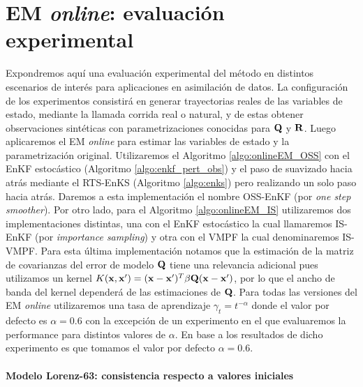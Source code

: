 \section{EM \textit{online}: evaluación experimental}

Expondremos aquí una evaluación experimental del método en distintos escenarios de interés para aplicaciones en asimilación de datos. La configuración de los experimentos consistirá en generar trayectorias reales de las variables de estado, mediante la llamada corrida real o natural, y de estas obtener observaciones sintéticas con parametrizaciones conocidas para $\mathbf{Q}$ y $\mathbf{R}$. Luego aplicaremos el EM \textit{online} para estimar las variables de estado y la parametrización original. Utilizaremos el Algoritmo \ref{algo:onlineEM_OSS} con el EnKF estocástico (Algoritmo \ref{algo:enkf_pert_obs}) y el paso de suavizado hacia atrás mediante el RTS-EnKS (Algoritmo \ref{algo:enks}) pero realizando un solo paso hacia atrás. Daremos a esta implementación el nombre OSS-EnKF (por \textit{one step smoother}). Por otro lado, para el Algoritmo \ref{algo:onlineEM_IS} utilizaremos dos implementaciones distintas, una con el EnKF estocástico la cual llamaremos IS-EnKF (por \textit{importance sampling}) y otra con el VMPF la cual denominaremos IS-VMPF. Para esta última implementación notamos que la estimación de la matriz de covarianzas del error de modelo $\mathbf{Q}$ tiene una relevancia adicional pues utilizamos un kernel $K(\mathbf{x}, \mathbf{x}') = (\mathbf{x} - \mathbf{x}')^T \beta \mathbf{Q} (\mathbf{x} - \mathbf{x}')$, por lo que el ancho de banda del kernel dependerá de las estimaciones de $\mathbf{Q}$. Para todas las versiones del EM \textit{online} utilizaremos una tasa de aprendizaje $\gamma_t = t^{-\alpha}$ \citep{Legland1997} donde el valor por defecto es $\alpha = 0.6$ con la excepción de un experimento en el que evaluaremos la performance para distintos valores de $\alpha$. En base a los resultados de dicho experimento es que tomamos el valor por defecto $\alpha = 0.6$.

\paragraph{Modelo Lorenz-63: consistencia respecto a valores iniciales} \

